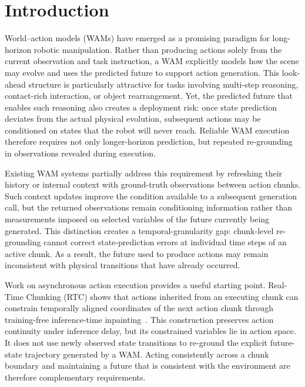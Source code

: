 
\section{Introduction}
\label{sec:introduction}


World--action models (WAMs) have emerged as a promising paradigm for long-horizon
robotic manipulation. Rather than producing actions solely from the current
observation and task instruction, a WAM explicitly models how the scene may evolve
and uses the predicted future to support action generation. This look-ahead
structure is particularly attractive for tasks involving multi-step reasoning,
contact-rich interaction, or object rearrangement. Yet, the predicted future that
enables such reasoning also creates a deployment risk: once state prediction
deviates from the actual physical evolution, subsequent actions may be conditioned
on states that the robot will never reach. Reliable WAM execution therefore
requires not only longer-horizon prediction, but repeated re-grounding in
observations revealed during execution.

Existing WAM systems partially address this requirement by refreshing their
history or internal context with ground-truth observations between action chunks.
Such context updates improve the condition available to a subsequent generation
call, but the returned observations remain conditioning information rather than
measurements imposed on selected variables of the future currently being
generated. This distinction creates a temporal-granularity gap: chunk-level
re-grounding cannot correct state-prediction errors at individual time steps of an
active chunk. As a result, the future used to produce actions may remain
inconsistent with physical transitions that have already occurred.

Work on asynchronous action execution provides a useful starting point. Real-Time
Chunking (RTC) shows that actions inherited from an executing chunk can constrain
temporally aligned coordinates of the next action chunk through training-free
inference-time inpainting~\cite{black2025realtime}. This construction preserves
action continuity under inference delay, but its constrained variables lie in
action space. It does not use newly observed state transitions to re-ground the
explicit future-state trajectory generated by a WAM. Acting consistently across a
chunk boundary and maintaining a future that is consistent with the environment
are therefore complementary requirements.

